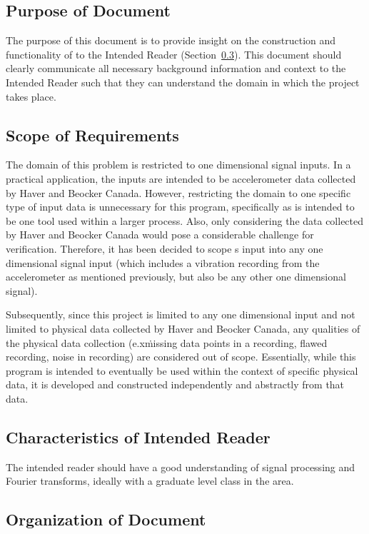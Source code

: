 \documentclass[12pt]{article}
\begin{document}
\subsection{Purpose of Document}
The purpose of this document is to provide insight on the construction and functionality of \progname{} to the Intended Reader (Section~\ref{sec_IntendedReader}). This document should clearly communicate all necessary background information and context to the Intended Reader such that they can understand the domain in which the project takes place.

\subsection{Scope of Requirements} 
The domain of this problem is restricted to one dimensional signal inputs. In a practical application, the inputs are intended to be accelerometer data collected by Haver and Beocker Canada. However, restricting the domain to one specific type of input data is unnecessary for this program, specifically as \progname{} is intended to be one tool used within a larger process. Also, only considering the data collected by Haver and Beocker Canada would pose a considerable challenge for verification. Therefore, it has been decided to scope \progname{}s input into any one dimensional signal input (which includes a vibration recording from the accelerometer as mentioned previously, but also be any other one dimensional signal).

Subsequently, since this project is limited to any one dimensional input and not limited to physical data collected by Haver and Beocker Canada, any qualities of the physical data collection (e.x\. missing data points in a recording, flawed recording, noise in recording) are considered out of scope. Essentially, while this program is intended to eventually be used within the context of specific physical data, it is developed and constructed independently and abstractly from that data. \\

\subsection{Characteristics of Intended Reader} \label{sec_IntendedReader}

The intended reader should have a good understanding of signal processing and Fourier transforms, ideally with a graduate level class in the area.

\subsection{Organization of Document}
\end{document}
